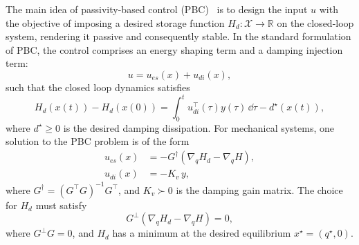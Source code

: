 The main idea of passivity-based control (PBC)~\cite{van2000l2} is to design the
input $u$ with the objective of imposing a desired storage function $H_d:
\mathcal{X} \rightarrow \mathbb{R}$ on the closed-loop system, rendering it
passive and consequently stable.
%
%
In the standard formulation of PBC, the control comprises an
energy shaping term and a damping injection term:
%
\begin{equation}
  u = u_{es}(x) + u_{di}(x),
  \label{eq:ida-pbc_control}
\end{equation}
%
such that the closed loop dynamics satisfies
%
\[
  H_d(x(t)) - H_d(x(0)) = \int_0^t u_{di}^\top(\tau) y(\tau) \, \dd \tau - d^\star(x(t)),
\]
%
where $d^\star \geq 0$ is the desired damping dissipation. 
%
For mechanical systems, one solution to the PBC problem is of the form
%
\begin{align*}
  u_{es}(x) &= 
  -G^{\dagger}
  \left( \nabla_q H_d - \nabla_q H \right), \\
  u_{di}(x) &= - K_{v} \, y,%
\end{align*}
%
where $G^\dagger = \left( G^\top G  \right)^{-1} G^\top$, and $K_v \succ 0$ is the
damping gain matrix. The choice for $H_d$ must satisfy
%
\[
  G^\bot \left( \nabla_q H_d - \nabla_q H \right) = 0,
\]
%
where $G^\perp G = 0$,
and $H_d$ has a minimum at the desired equilibrium $x^\star = (q^\star, 0)$. 
%


